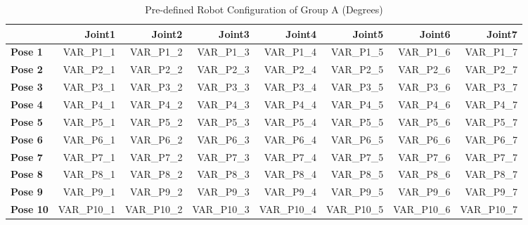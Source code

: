 \begin{table}[]
	\centering
	\caption{Pre-defined Robot Configuration of Group A (Degrees)}
	\label{table-groupA}
	\begin{tabular}{|l|r|r|r|r|r|r|r|}
		\hline
		\textbf{} & \textbf{Joint1} & \textbf{Joint2} & \textbf{Joint3} & \textbf{Joint4} & \textbf{Joint5} & \textbf{Joint6} & \textbf{Joint7} \\ \hline
		\textbf{Pose 1}  & VAR_P1_1     & VAR_P1_2     & VAR_P1_3     & VAR_P1_4     & VAR_P1_5      & VAR_P1_6      & VAR_P1_7      \\ \hline
		\textbf{Pose 2}  & VAR_P2_1     & VAR_P2_2     & VAR_P2_3     & VAR_P2_4     & VAR_P2_5      & VAR_P2_6      & VAR_P2_7      \\ \hline
		\textbf{Pose 3}  & VAR_P3_1     & VAR_P3_2     & VAR_P3_3     & VAR_P3_4     & VAR_P3_5      & VAR_P3_6      & VAR_P3_7      \\ \hline
		\textbf{Pose 4}  & VAR_P4_1     & VAR_P4_2     & VAR_P4_3     & VAR_P4_4     & VAR_P4_5      & VAR_P4_6      & VAR_P4_7      \\ \hline
		\textbf{Pose 5}  & VAR_P5_1     & VAR_P5_2     & VAR_P5_3     & VAR_P5_4     & VAR_P5_5      & VAR_P5_6      & VAR_P5_7      \\ \hline
		\textbf{Pose 6}  & VAR_P6_1     & VAR_P6_2     & VAR_P6_3     & VAR_P6_4     & VAR_P6_5      & VAR_P6_6      & VAR_P6_7      \\ \hline
		\textbf{Pose 7}  & VAR_P7_1     & VAR_P7_2     & VAR_P7_3     & VAR_P7_4     & VAR_P7_5      & VAR_P7_6      & VAR_P7_7      \\ \hline
		\textbf{Pose 8}  & VAR_P8_1     & VAR_P8_2     & VAR_P8_3     & VAR_P8_4     & VAR_P8_5      & VAR_P8_6      & VAR_P8_7      \\ \hline
		\textbf{Pose 9}  & VAR_P9_1     & VAR_P9_2     & VAR_P9_3     & VAR_P9_4     & VAR_P9_5      & VAR_P9_6      & VAR_P9_7      \\ \hline
		\textbf{Pose 10} & VAR_P10_1    & VAR_P10_2    & VAR_P10_3    & VAR_P10_4    & VAR_P10_5     & VAR_P10_6     & VAR_P10_7      \\ \hline
	\end{tabular}

\end{table}


